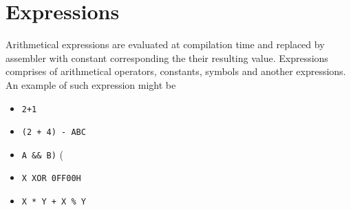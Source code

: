         \section{Expressions}
        Arithmetical expressions are evaluated at compilation time and replaced by assembler
        with constant corresponding the their resulting value. Expressions comprises of arithmetical operators,
        constants, symbols and another expressions. An example of such expression might be
                \begin{itemize}
                    \item  \texttt{2+1}
                    \item  \texttt{(2 + 4) - ABC}
                    \item  \texttt{A \&\& B)} (
                    \item  \texttt{X XOR 0FF00H}
                    \item  \texttt{X * Y + X \% Y}
                \end{itemize}

